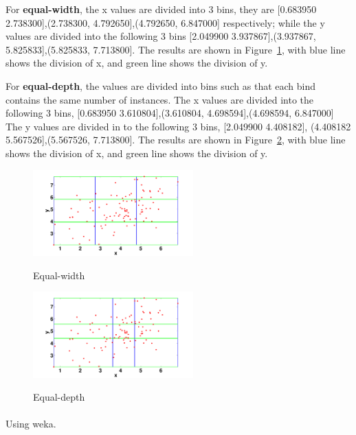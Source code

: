 \documentclass[11pt, final]{article}
\begin{document}
\begin{enumerate}[(a)]
For \textbf{equal-width}, the x values are divided into 3 bins, they are [0.683950 2.738300],(2.738300, 4.792650],(4.792650, 6.847000] respectively; while the y values are divided into the following 3 bins  [2.049900 3.937867],(3.937867, 5.825833],(5.825833, 7.713800]. The results are shown in Figure~\ref{fig: equal-length}, with blue line shows the division of x, and green line shows the division of y.

For \textbf{equal-depth}, the values are divided into bins such as that each bind contains the same number of instances. The x values are divided into the following 3 bins, [0.683950 3.610804],(3.610804, 4.698594],(4.698594, 6.847000] The y values are divided in to the following 3 bins, [2.049900 4.408182], (4.408182 5.567526],(5.567526, 7.713800]. The results are shown in Figure~\ref{fig: equal-depth}, with blue line shows the division of x, and green line shows the division of y.



\begin{figure}[!ht]
  \caption{Equal-width}
  \centering
   \includegraphics[width=0.55\textwidth]{equal-length.pdf}
   \label{fig: equal-length}
\end{figure}

\begin{figure}[!ht]
  \caption{Equal-depth}
  \centering
   \includegraphics[width=0.55\textwidth]{equal-depth.pdf}
   \label{fig: equal-depth}
\end{figure}


\end{enumerate} 


\paragraph{ } Using weka.
\end{document}
